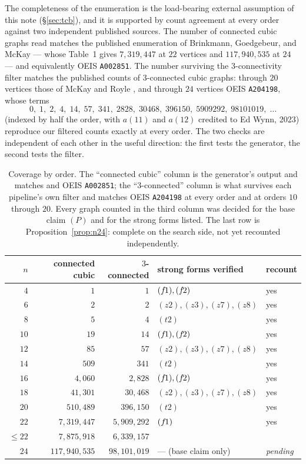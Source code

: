 \documentclass[11pt]{amsart}
\theoremstyle{plain}
\theoremstyle{definition}
\theoremstyle{remark}
\begin{document}
The completeness of the enumeration is the load-bearing external
assumption of this note (\S\ref{sec:tcb}), and it is supported by count
agreement at every order against two independent published sources. The
number of connected cubic graphs read matches the published enumeration
of Brinkmann, Goedgebeur, and McKay \cite{BGM11} --- whose Table~1 gives
$7{,}319{,}447$ at $22$ vertices and $117{,}940{,}535$ at $24$ --- and
equivalently OEIS \texttt{A002851}. The number surviving the
$3$-connectivity filter matches the published counts of $3$-connected
cubic graphs: through $20$ vertices those of McKay and Royle
\cite{McKR86}, and through $24$ vertices OEIS \texttt{A204198}, whose
terms
\[
  0,\;1,\;2,\;4,\;14,\;57,\;341,\;2828,\;30468,\;396150,\;5909292,\;
  98101019,\;\dots
\]
(indexed by half the order, with $a(11)$ and $a(12)$ credited to Ed Wynn,
2023) reproduce our filtered counts exactly at every order. The two
checks are independent of each other in the useful direction: the first
tests the generator, the second tests the filter.

\begin{table}[t]
\centering
\begin{tabular}{r r r l l}
\toprule
$n$ & connected cubic & $3$-connected & strong forms verified & recount \\
\midrule
$4$  & $1$ & $1$ & $(f\mkern-2mu1),(f\mkern-2mu2)$ & yes \\
$6$  & $2$ & $2$ & $(z2),(z3),(z7),(z8)$ & yes \\
$8$  & $5$ & $4$ & $(t2)$ & yes \\
$10$ & $19$ & $14$ & $(f\mkern-2mu1),(f\mkern-2mu2)$ & yes \\
$12$ & $85$ & $57$ & $(z2),(z3),(z7),(z8)$ & yes \\
$14$ & $509$ & $341$ & $(t2)$ & yes \\
$16$ & $4{,}060$ & $2{,}828$ & $(f\mkern-2mu1),(f\mkern-2mu2)$ & yes \\
$18$ & $41{,}301$ & $30{,}468$ & $(z2),(z3),(z7),(z8)$ & yes \\
$20$ & $510{,}489$ & $396{,}150$ & $(t2)$ & yes \\
$22$ & $7{,}319{,}447$ & $5{,}909{,}292$ & $(f\mkern-2mu1)$ & yes \\
\midrule
$\le 22$ & $7{,}875{,}918$ & $6{,}339{,}157$ & & \\
\midrule
$24$ & $117{,}940{,}535$ & $98{,}101{,}019$ & --- (base claim only) &
  \emph{pending} \\
\bottomrule
\end{tabular}
\medskip
\caption{Coverage by order. The ``connected cubic'' column is the
generator's output and matches \cite{BGM11} and OEIS \texttt{A002851};
the ``$3$-connected'' column is what survives each pipeline's own filter
and matches OEIS \texttt{A204198} at every order and \cite{McKR86} at
orders $10$ through $20$. Every graph counted
in the third column was decided for the base claim $(P)$ and for the
strong forms listed. The last row is Proposition~\ref{prop:n24}: complete
on the search side, not yet recounted independently.}
\label{tab:counts}
\end{table}
\end{document}
